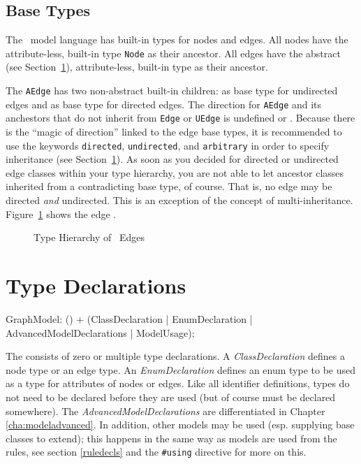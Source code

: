 \subsection{Base Types}
\label{sct:basetypes}
The \GrG\ model language has built-in types for nodes and edges.
All nodes have the attribute-less, built-in type \texttt{Node} as their ancestor.
All edges have the abstract (see Section~\ref{typedecl}), attribute-less, built-in type \texttt{} as their ancestor.

The \texttt{AEdge} has two non-abstract built-in children: \texttt{} as base type for undirected edges and \texttt{} as base type for directed edges.
The direction for \texttt{AEdge} and its anchestors that do not inherit from \texttt{Edge} or \texttt{UEdge} is undefined or .
Because there is the ``magic of direction'' linked to the edge base types, it is recommended to use the keywords \texttt{directed}, \texttt{undirected}, and \texttt{arbitrary} in order to specify inheritance (see Section~\ref{typedecl}).
As soon as you decided for directed or undirected edge classes within your type hierarchy, you are not able to let ancestor classes inherited from a contradicting base type, of course.
That is, no edge may be directed \emph{and} undirected.
This is an exception of the concept of multi-inheritance.
Figure~\ref{fig:basetypes} shows the edge .
\begin{figure}[htbp]
	\centering
	
	\caption{Type Hierarchy of \GrG\ Edges}
	\label{fig:basetypes}
\end{figure}


\section{Type Declarations}
\label{typedecl}

\begin{rail}
  GraphModel: () + (ClassDeclaration
  									 | EnumDeclaration
  									 | AdvancedModelDeclarations
  									 | ModelUsage);
\end{rail}
The  consists of zero or multiple type declarations.
A \emph{ClassDeclaration} defines a node type or an edge type.
An \emph{EnumDeclaration} defines an enum type to be used as a type for attributes of nodes or edges.
Like all identifier definitions, types do not need to be declared before they are used (but of course must be declared somewhere).
The \emph{AdvancedModelDeclarations} are differentiated in Chapter \ref{cha:modeladvanced}.
In addition, other models may be used (esp. supplying base classes to extend); this happens in the same way as models are used from the rules, see section \ref{ruledecls} and the \verb/#using/ directive for more on this.


